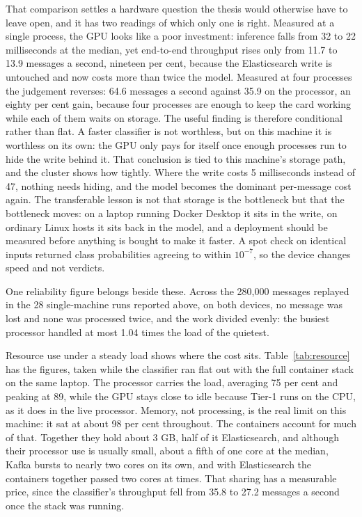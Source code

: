 That comparison settles a hardware question the thesis would otherwise have to leave open, and it has two readings of which only one is right. Measured at a single process, the GPU looks like a poor investment: inference falls from 32 to 22 milliseconds at the median, yet end-to-end throughput rises only from 11.7 to 13.9 messages a second, nineteen per cent, because the Elasticsearch write is untouched and now costs more than twice the model. Measured at four processes the judgement reverses: 64.6 messages a second against 35.9 on the processor, an eighty per cent gain, because four processes are enough to keep the card working while each of them waits on storage. The useful finding is therefore conditional rather than flat. A faster classifier is not worthless, but on this machine it is worthless on its own: the GPU only pays for itself once enough processes run to hide the write behind it. That conclusion is tied to this machine's storage path, and the cluster shows how tightly. Where the write costs 5 milliseconds instead of 47, nothing needs hiding, and the model becomes the dominant per-message cost again. The transferable lesson is not that storage is the bottleneck but that the bottleneck moves: on a laptop running Docker Desktop it sits in the write, on ordinary Linux hosts it sits back in the model, and a deployment should be measured before anything is bought to make it faster. A spot check on identical inputs returned class probabilities agreeing to within $10^{-7}$, so the device changes speed and not verdicts.

One reliability figure belongs beside these. Across the 280,000 messages replayed in the 28 single-machine runs reported above, on both devices, no message was lost and none was processed twice, and the work divided evenly: the busiest processor handled at most 1.04 times the load of the quietest.

Resource use under a steady load shows where the cost sits. Table~\ref{tab:resource} has the figures, taken while the classifier ran flat out with the full container stack on the same laptop. The processor carries the load, averaging 75 per cent and peaking at 89, while the GPU stays close to idle because Tier-1 runs on the CPU, as it does in the live processor. Memory, not processing, is the real limit on this machine: it sat at about 98 per cent throughout. The containers account for much of that. Together they hold about 3 GB, half of it Elasticsearch, and although their processor use is usually small, about a fifth of one core at the median, Kafka bursts to nearly two cores on its own, and with Elasticsearch the containers together passed two cores at times. That sharing has a measurable price, since the classifier's throughput fell from 35.8 to 27.2 messages a second once the stack was running.

